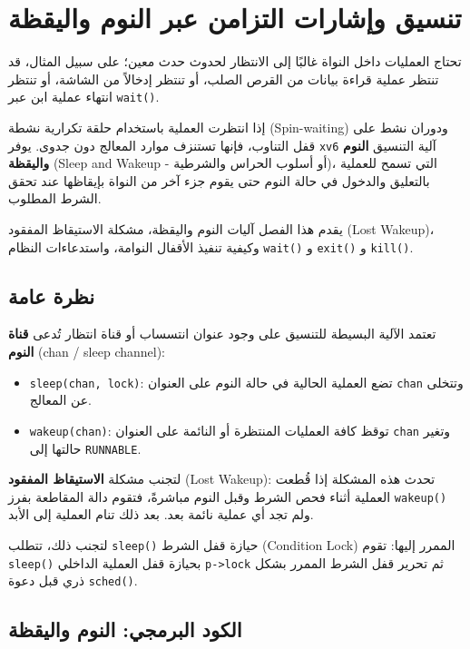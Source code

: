 \chapter{تنسيق وإشارات التزامن عبر النوم واليقظة}
\label{CH:SLEEP}

تحتاج العمليات داخل النواة غالبًا إلى الانتظار لحدوث حدث معين؛
على سبيل المثال، قد تنتظر عملية قراءة بيانات من القرص الصلب، أو تنتظر إدخالاً من الشاشة، أو تنتظر انتهاء عملية ابن عبر \texttt{wait()}.

إذا انتظرت العملية باستخدام حلقة تكرارية نشطة (Spin-waiting) ودوران نشط على قفل التناوب، فإنها تستنزف موارد المعالج دون جدوى.
يوفر \texttt{xv6} آلية التنسيق \textbf{النوم واليقظة} (Sleep and Wakeup - أو أسلوب الحراس والشرطية)، التي تسمح للعملية بالتعليق والدخول في حالة النوم حتى يقوم جزء آخر من النواة بإيقاظها عند تحقق الشرط المطلوب.

يقدم هذا الفصل آليات النوم واليقظة، مشكلة الاستيقاظ المفقود (Lost Wakeup)، وكيفية تنفيذ الأقفال النوامة، واستدعاءات النظام \texttt{wait()} و \texttt{exit()} و \texttt{kill()}.

\section{نظرة عامة}
\label{sec:sleep_overview}

تعتمد الآلية البسيطة للتنسيق على وجود عنوان انتسساب أو قناة انتظار تُدعى \textbf{قناة النوم} (chan / sleep channel):
\begin{itemize}
  \item \texttt{sleep(chan, lock)}: تضع العملية الحالية في حالة النوم على العنوان \texttt{chan} وتتخلى عن المعالج.
  \item \texttt{wakeup(chan)}: توقظ كافة العمليات المنتظرة أو النائمة على العنوان \texttt{chan} وتغير حالتها إلى \texttt{RUNNABLE}.
\end{itemize}

لتجنب مشكلة \textbf{الاستيقاظ المفقود} (Lost Wakeup):
تحدث هذه المشكلة إذا قُطعت العملية أثناء فحص الشرط وقبل النوم مباشرةً، فتقوم دالة المقاطعة بفرز \texttt{wakeup()} ولم تجد أي عملية نائمة بعد. بعد ذلك تنام العملية إلى الأبد.

لتجنب ذلك، تتطلب \texttt{sleep()} حيازة قفل الشرط (Condition Lock) الممرر إليها:
تقوم \texttt{sleep()} بحيازة قفل العملية الداخلي \texttt{p->lock} ثم تحرير قفل الشرط الممرر بشكل ذري قبل دعوة \texttt{sched()}.

\section{الكود البرمجي: النوم واليقظة}
\label{sec:code_sleep_wakeup}

